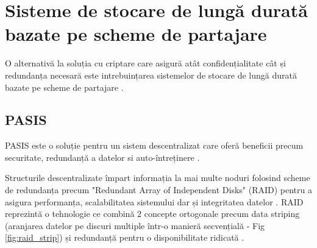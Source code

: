 \documentclass[oneside, 12pt]{book}
\begin{document}

\section{Sisteme de stocare de lungă durată bazate pe scheme de partajare}
\label{sec:long_term_systems_full}

O alternativă la soluția cu criptare care asigură atât confidențialitate cât și redundanța necesară este intrebuințarea sistemelor de stocare de lungă durată bazate pe scheme de partajare \cite{W:2000,SBM:2005,SGMV:2009}.


\subsection{PASIS}
\label{sec:desc_pasis}
PASIS este o soluție pentru un sistem descentralizat care oferă beneficii precum securitate, redundanță a datelor si auto-întreținere \cite{W:2000}.

Structurile descentralizate împart informația la mai multe noduri folosind scheme de redundanța precum "Redundant Array of Independent Disks" (RAID) pentru a asigura performanța, scalabilitatea sistemului dar și integritatea datelor \cite{Patterson:1988}.
RAID reprezintă o tehnologie ce combină $2$ concepte ortogonale precum data striping (aranjarea datelor pe discuri multiple într-o manieră secvențială - Fig \ref{fig:raid_strip}) și redundanță pentru o disponibilitate ridicată \cite{Chen:1994}.
\end{document}
